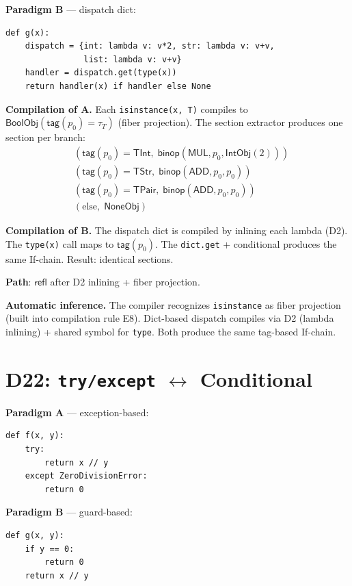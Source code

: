 \documentclass[11pt,a4paper]{report}
\theoremstyle{definition}
\theoremstyle{plain}
\begin{document}
\textbf{Paradigm B} --- dispatch dict:
\begin{lstlisting}
def g(x):
    dispatch = {int: lambda v: v*2, str: lambda v: v+v,
                list: lambda v: v+v}
    handler = dispatch.get(type(x))
    return handler(x) if handler else None
\end{lstlisting}

\textbf{Compilation of A.}
Each \texttt{isinstance(x, T)} compiles to
$\mathsf{BoolObj}(\mathsf{tag}(p_0) = \tau_T)$ (fiber projection).
The section extractor produces one section per branch:
\begin{align}
  &(\mathsf{tag}(p_0) = \mathsf{TInt},\; \mathsf{binop}(\mathsf{MUL}, p_0, \mathsf{IntObj}(2))) \\
  &(\mathsf{tag}(p_0) = \mathsf{TStr},\; \mathsf{binop}(\mathsf{ADD}, p_0, p_0)) \\
  &(\mathsf{tag}(p_0) = \mathsf{TPair},\; \mathsf{binop}(\mathsf{ADD}, p_0, p_0)) \\
  &(\text{else},\; \mathsf{NoneObj})
\end{align}

\textbf{Compilation of B.}
The dispatch dict is compiled by inlining each lambda (D2).  The
\texttt{type(x)} call maps to $\mathsf{tag}(p_0)$.  The
\texttt{dict.get} + conditional produces the same If-chain.
Result: identical sections.

\textbf{Path}: $\mathsf{refl}$ after D2 inlining + fiber projection.

\textbf{Automatic inference.}
The compiler recognizes \texttt{isinstance} as fiber projection
(built into compilation rule E8).  Dict-based dispatch compiles
via D2 (lambda inlining) + shared symbol for \texttt{type}.  Both
produce the same tag-based If-chain.

\section{D22: \texttt{try/except} $\leftrightarrow$ Conditional}
\label{sec:d22-effect}

\textbf{Paradigm A} --- exception-based:
\begin{lstlisting}
def f(x, y):
    try:
        return x // y
    except ZeroDivisionError:
        return 0
\end{lstlisting}

\textbf{Paradigm B} --- guard-based:
\begin{lstlisting}
def g(x, y):
    if y == 0:
        return 0
    return x // y
\end{lstlisting}
\end{document}
